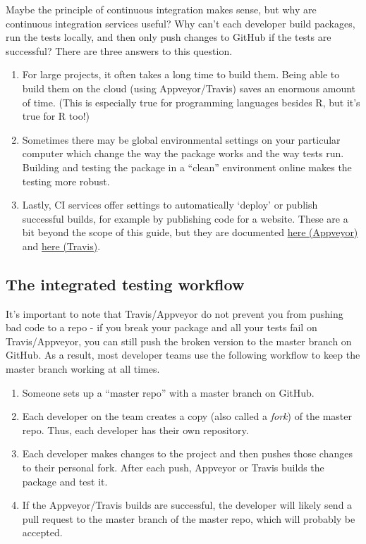\documentclass[]{book}
\providecommand{\tightlist}{%
  \setlength{\itemsep}{0pt}\setlength{\parskip}{0pt}}
\begin{document}
Maybe the principle of continuous integration makes sense, but why are
continuous integration services useful? Why can't each developer build
packages, run the tests locally, and then only push changes to GitHub if
the tests are successful? There are three answers to this question.

\begin{enumerate}
\def\labelenumi{\arabic{enumi}.}
\tightlist
\item
  For large projects, it often takes a long time to build them. Being
  able to build them on the cloud (using Appveyor/Travis) saves an
  enormous amount of time. (This is especially true for programming
  languages besides R, but it's true for R too!)
\item
  Sometimes there may be global environmental settings on your
  particular computer which change the way the package works and the way
  tests run. Building and testing the package in a ``clean'' environment
  online makes the testing more robust.
\item
  Lastly, CI services offer settings to automatically `deploy' or
  publish successful builds, for example by publishing code for a
  website. These are a bit beyond the scope of this guide, but they are
  documented \href{https://www.appveyor.com/docs/deployment/}{here
  (Appveyor)} and
  \href{https://docs.travis-ci.com/user/deployment/}{here (Travis)}.
\end{enumerate}

\subsection{The integrated testing
workflow}\label{the-integrated-testing-workflow}

It's important to note that Travis/Appveyor do not prevent you from
pushing bad code to a repo - if you break your package and all your
tests fail on Travis/Appveyor, you can still push the broken version to
the master branch on GitHub. As a result, most developer teams use the
following workflow to keep the master branch working at all times.

\begin{enumerate}
\def\labelenumi{\arabic{enumi}.}
\tightlist
\item
  Someone sets up a ``master repo'' with a master branch on GitHub.
\item
  Each developer on the team creates a copy (also called a \emph{fork})
  of the master repo. Thus, each developer has their own repository.
\item
  Each developer makes changes to the project and then pushes those
  changes to their personal fork. After each push, Appveyor or Travis
  builds the package and test it.
\item
  If the Appveyor/Travis builds are successful, the developer will
  likely send a pull request to the master branch of the master repo,
  which will probably be accepted.
\end{enumerate}
\end{document}
